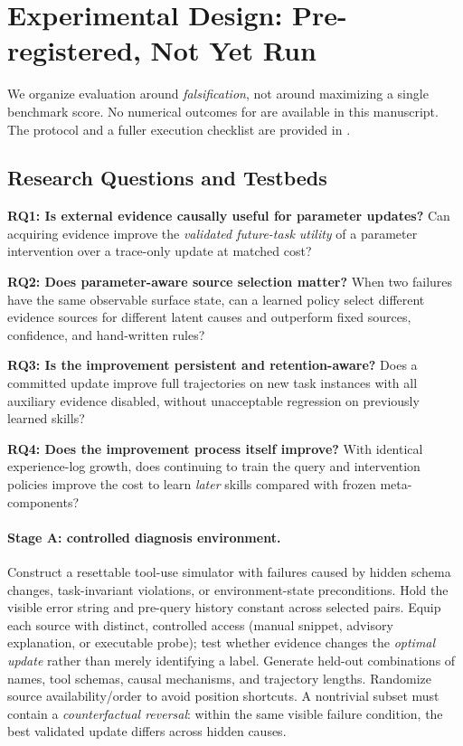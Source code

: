 \section{Experimental Design: Pre-registered, Not Yet Run}
\label{sec:experiments}
We organize evaluation around \emph{falsification}, not around maximizing
a single benchmark score. No numerical outcomes for \spear{} are available
in this manuscript. The protocol and a fuller execution checklist are
provided in .

\subsection{Research Questions and Testbeds}
\textbf{RQ1: Is external evidence causally useful for parameter updates?}
Can acquiring evidence improve the \emph{validated future-task utility}
of a parameter intervention over a trace-only update at matched cost?

\textbf{RQ2: Does parameter-aware source selection matter?}
When two failures have the same observable surface state, can a learned
policy select different evidence sources for different latent causes
and outperform fixed sources, confidence, and hand-written rules?

\textbf{RQ3: Is the improvement persistent and retention-aware?}
Does a committed update improve full trajectories on new task
instances with all auxiliary evidence disabled, without unacceptable
regression on previously learned skills?

\textbf{RQ4: Does the improvement process itself improve?}
With identical experience-log growth, does continuing to train
the query and intervention policies improve the cost to learn
\emph{later} skills compared with frozen meta-components?

\paragraph{Stage A: controlled diagnosis environment.}
Construct a resettable tool-use simulator with failures caused by
hidden schema changes, task-invariant violations, or environment-state
preconditions. Hold the visible error string and pre-query history
constant across selected pairs. Equip each source with distinct,
controlled access (manual snippet, advisory explanation, or executable
probe); test whether evidence changes the \emph{optimal update}
rather than merely identifying a label. Generate held-out
combinations of names, tool schemas, causal mechanisms, and
trajectory lengths. Randomize source availability/order to avoid
position shortcuts. A nontrivial subset must contain a
\emph{counterfactual reversal}: within the same visible failure
condition, the best validated update differs across hidden causes.

